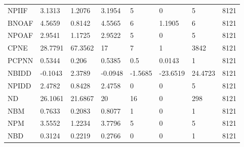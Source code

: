 \begin{table}[!htbp]
\begin{tabular}{@{}llllllll@{}}
NPIIF & 3.1313                    & 1.2076                            & 3.1954                      & 5                        & 0                        & 5                        & 8121                  \\
BNOAF & 4.5659                    & 0.8142                            & 4.5565                      & 6                        & 1.1905                   & 6                        & 8121                  \\
NPOAF & 2.9541                    & 1.1725                            & 2.9522                      & 5                        & 0                        & 5                        & 8121                  \\
CPNE  & 28.7791                   & 67.3562                           & 17                          & 7                        & 1                        & 3842                     & 8121                  \\
PCPNN & 0.5344                    & 0.206                             & 0.5385                      & 0.5                      & 0.0143                   & 1                        & 8121                  \\
NBIDD & -0.1043                   & 2.3789                            & -0.0948                     & -1.5685                  & -23.6519                 & 24.4723                  & 8121                  \\
NPIDD & 2.4782                    & 0.8428                            & 2.4758                      & 0                        & 0                        & 5                        & 8121                  \\
ND    & 26.1061                   & 21.6867                           & 20                          & 16                       & 0                        & 298                      & 8121                  \\
NBM   & 0.7633                    & 0.2083                            & 0.8077                      & 1                        & 0                        & 1                        & 8121                  \\
NPM   & 3.5552                    & 1.2234                            & 3.7796                      & 5                        & 0                        & 5                        & 8121                  \\
NBD   & 0.3124                    & 0.2219                            & 0.2766                      & 0                        & 0                        & 1                        & 8121                  \\

\end{tabular}
\end{table}
